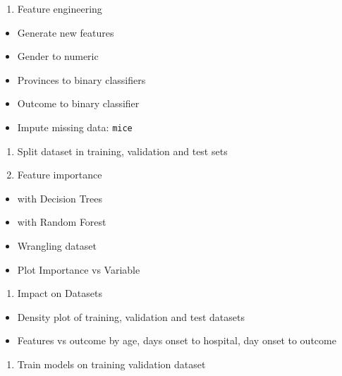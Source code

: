 \documentclass[]{book}
\providecommand{\tightlist}{%
  \setlength{\itemsep}{0pt}\setlength{\parskip}{0pt}}
\begin{document}
\begin{enumerate}
\def\labelenumi{\arabic{enumi}.}
\setcounter{enumi}{3}
\tightlist
\item
  Feature engineering
\end{enumerate}

\begin{itemize}
\tightlist
\item
  Generate new features
\item
  Gender to numeric
\item
  Provinces to binary classifiers
\item
  Outcome to binary classifier
\item
  Impute missing data: \texttt{mice}
\end{itemize}

\begin{enumerate}
\def\labelenumi{\arabic{enumi}.}
\setcounter{enumi}{4}
\tightlist
\item
  Split dataset in training, validation and test sets\\
\item
  Feature importance
\end{enumerate}

\begin{itemize}
\tightlist
\item
  with Decision Trees
\item
  with Random Forest
\item
  Wrangling dataset
\item
  Plot Importance vs Variable
\end{itemize}

\begin{enumerate}
\def\labelenumi{\arabic{enumi}.}
\setcounter{enumi}{6}
\tightlist
\item
  Impact on Datasets\\
\end{enumerate}

\begin{itemize}
\tightlist
\item
  Density plot of training, validation and test datasets
\item
  Features vs outcome by age, days onset to hospital, day onset to outcome
\end{itemize}

\begin{enumerate}
\def\labelenumi{\arabic{enumi}.}
\setcounter{enumi}{7}
\tightlist
\item
  Train models on training validation dataset
\end{enumerate}
\end{document}
